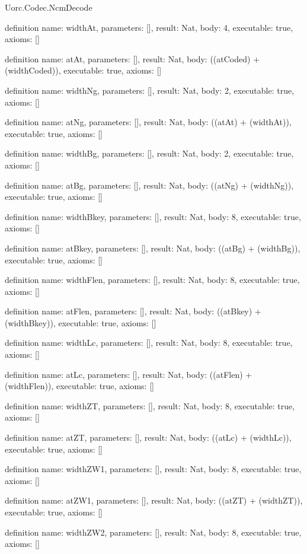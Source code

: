 \begin{lexlean}{Uorc.Codec.NcmDecode}
\begin{semanticmodule}
definition{
  name: widthAt,
  parameters: [],
  result: Nat,
  body: 4,
  executable: true,
  axioms: []
}

definition{
  name: atAt,
  parameters: [],
  result: Nat,
  body: ((atCoded) + (widthCoded)),
  executable: true,
  axioms: []
}

definition{
  name: widthNg,
  parameters: [],
  result: Nat,
  body: 2,
  executable: true,
  axioms: []
}

definition{
  name: atNg,
  parameters: [],
  result: Nat,
  body: ((atAt) + (widthAt)),
  executable: true,
  axioms: []
}

definition{
  name: widthBg,
  parameters: [],
  result: Nat,
  body: 2,
  executable: true,
  axioms: []
}

definition{
  name: atBg,
  parameters: [],
  result: Nat,
  body: ((atNg) + (widthNg)),
  executable: true,
  axioms: []
}

definition{
  name: widthBkey,
  parameters: [],
  result: Nat,
  body: 8,
  executable: true,
  axioms: []
}

definition{
  name: atBkey,
  parameters: [],
  result: Nat,
  body: ((atBg) + (widthBg)),
  executable: true,
  axioms: []
}

definition{
  name: widthFlen,
  parameters: [],
  result: Nat,
  body: 8,
  executable: true,
  axioms: []
}

definition{
  name: atFlen,
  parameters: [],
  result: Nat,
  body: ((atBkey) + (widthBkey)),
  executable: true,
  axioms: []
}

definition{
  name: widthLc,
  parameters: [],
  result: Nat,
  body: 8,
  executable: true,
  axioms: []
}

definition{
  name: atLc,
  parameters: [],
  result: Nat,
  body: ((atFlen) + (widthFlen)),
  executable: true,
  axioms: []
}

definition{
  name: widthZT,
  parameters: [],
  result: Nat,
  body: 8,
  executable: true,
  axioms: []
}

definition{
  name: atZT,
  parameters: [],
  result: Nat,
  body: ((atLc) + (widthLc)),
  executable: true,
  axioms: []
}

definition{
  name: widthZW1,
  parameters: [],
  result: Nat,
  body: 8,
  executable: true,
  axioms: []
}

definition{
  name: atZW1,
  parameters: [],
  result: Nat,
  body: ((atZT) + (widthZT)),
  executable: true,
  axioms: []
}

definition{
  name: widthZW2,
  parameters: [],
  result: Nat,
  body: 8,
  executable: true,
  axioms: []
}


\end{semanticmodule}
\end{lexlean}
